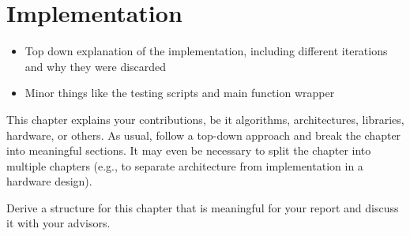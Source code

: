 \chapter{Implementation}
\label{ch:implementation}

\begin{itemize}
  \item Top down explanation of the implementation, including different iterations and why they
        were discarded
  \item Minor things like the testing scripts and main function wrapper
\end{itemize}

{\color{red}
	This chapter explains your contributions, be it algorithms, architectures, libraries, hardware, or others.
	As usual, follow a top-down approach and break the chapter into meaningful sections.
	It may even be necessary to split the chapter into multiple chapters (e.g., to separate architecture from implementation in a hardware design).

	Derive a structure for this chapter that is meaningful for your report and discuss it with your advisors.
}
